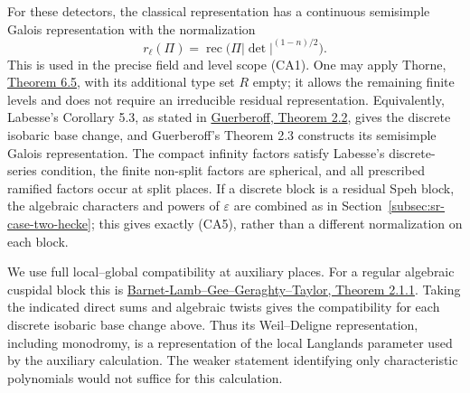 For these detectors, the classical representation has a
continuous semisimple Galois representation with the
normalization
\[
 r_\ell(\Pi)=\operatorname{rec}
                   \bigl(\Pi|\det|^{(1-n)/2}\bigr).
                                                               \tag{CA5}
\]
This is used in the precise field and level scope (CA1).
One may apply Thorne,
\href{https://arxiv.org/pdf/1107.5989v1}{Theorem 6.5},
with its additional type set \(R\) empty; it allows the
remaining finite levels and does not require an irreducible
residual representation.
Equivalently, Labesse's Corollary 5.3, as stated in
\href{https://arxiv.org/pdf/0906.4189}{Guerberoff, Theorem 2.2},
gives the discrete isobaric base change, and Guerberoff's
Theorem 2.3 constructs its semisimple Galois representation.
The compact infinity factors satisfy Labesse's discrete-series
condition, the finite non-split factors are spherical, and
all prescribed ramified factors occur at split places.
If a discrete block is a residual Speh block, the algebraic
characters and powers of \(\varepsilon\) are combined as
in Section~\ref{subsec:sr-case-two-hecke}; this gives exactly
(CA5), rather than a different normalization on each block.

We use full local--global compatibility at auxiliary places.
For a regular algebraic cuspidal block this is
\href{https://annals.math.princeton.edu/wp-content/uploads/annals-v179-n2-p03-p.pdf}
{Barnet-Lamb--Gee--Geraghty--Taylor, Theorem 2.1.1}.
Taking the indicated direct sums and algebraic twists gives
the compatibility for each discrete isobaric base change
above. Thus its Weil--Deligne representation, including
monodromy, is a representation of the local Langlands
parameter used by the auxiliary calculation.
The weaker statement identifying only characteristic
polynomials would not suffice for this calculation.

